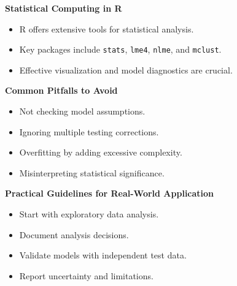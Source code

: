 \documentclass[11pt,a4paper]{article}
\begin{document}
\begin{mdframed}[linecolor=tipcolor!75!black,backgroundcolor=tipcolor!5!white]
\textbf{Statistical Computing in R}
\begin{itemize}
  \item R offers extensive tools for statistical analysis.
  \item Key packages include \texttt{stats}, \texttt{lme4}, \texttt{nlme}, and \texttt{mclust}.
  \item Effective visualization and model diagnostics are crucial.
\end{itemize}
\end{mdframed}

\begin{mdframed}[linecolor=warningcolor!75!black,backgroundcolor=warningcolor!5!white]
\textbf{Common Pitfalls to Avoid}
\begin{itemize}
  \item Not checking model assumptions.
  \item Ignoring multiple testing corrections.
  \item Overfitting by adding excessive complexity.
  \item Misinterpreting statistical significance.
\end{itemize}
\end{mdframed}

\begin{mdframed}[linecolor=maincolor,backgroundcolor=gray!5!white]
\textbf{Practical Guidelines for Real-World Application}
\begin{itemize}
  \item Start with exploratory data analysis.
  \item Document analysis decisions.
  \item Validate models with independent test data.
  \item Report uncertainty and limitations.
\end{itemize}
\end{mdframed}
\end{document}
